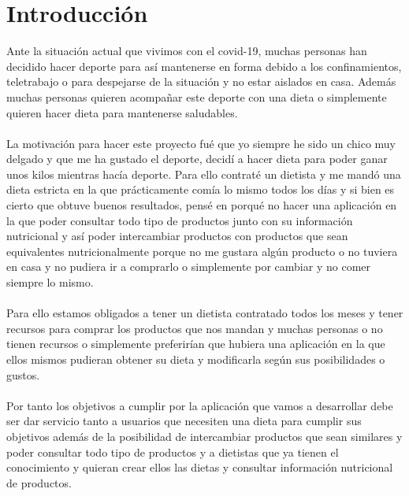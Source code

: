 \chapter{Introducción}

Ante la situación actual que vivimos con el covid-19, muchas personas han decidido hacer deporte 
para así mantenerse en forma debido a los confinamientos, teletrabajo o para despejarse de la 
situación y no estar aislados en casa. 
Además muchas personas quieren acompañar este deporte con una dieta o simplemente quieren hacer 
dieta para mantenerse saludables.
\\\\
La motivación para hacer este proyecto fué que yo siempre he sido un chico muy delgado y que 
me ha gustado el deporte, decidí a hacer dieta para poder ganar unos kilos mientras hacía deporte.
Para ello contraté un dietista y me mandó una dieta estricta en la que prácticamente comía lo mismo 
todos los días y si bien es cierto que obtuve buenos resultados, pensé en porqué no hacer una aplicación 
en la que poder consultar todo tipo de productos junto con su información nutricional y así poder 
intercambiar productos con productos que sean equivalentes nutricionalmente porque no me gustara algún 
producto o no tuviera en casa y no pudiera ir a comprarlo o simplemente por cambiar y no comer siempre lo mismo.
\\\\
Para ello estamos obligados a tener un dietista contratado todos los meses y tener recursos para 
comprar los productos que nos mandan y muchas personas o no tienen recursos o simplemente preferirían
que hubiera una aplicación en la que ellos mismos pudieran obtener su dieta y modificarla según sus 
posibilidades o gustos.
\\\\
Por tanto los objetivos a cumplir por la aplicación que vamos a desarrollar debe ser dar servicio tanto a
usuarios que necesiten una dieta para cumplir sus objetivos además de la posibilidad de intercambiar productos 
que sean similares y poder consultar todo tipo de productos y a dietistas que ya tienen el conocimiento y
quieran crear ellos las dietas y consultar información nutricional de productos.